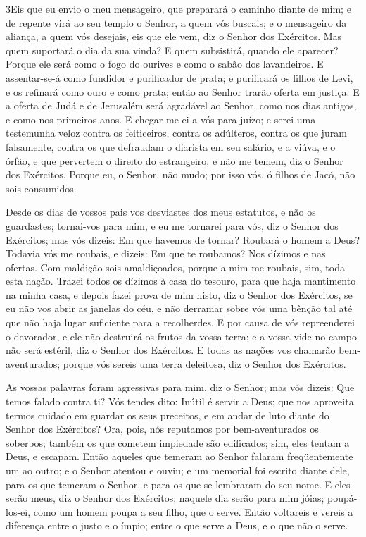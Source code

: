 \medskip

\lettrine{3} Eis que eu envio o meu mensageiro, que preparará
o caminho diante de mim; e de repente virá ao seu templo o Senhor, a
quem vós buscais; e o mensageiro da aliança, a quem vós desejais,
eis que ele vem, diz o Senhor dos Exércitos. Mas quem suportará
o dia da sua vinda? E quem subsistirá, quando ele aparecer? Porque
ele será como o fogo do ourives e como o sabão dos lavandeiros.
E assentar-se-á como fundidor e purificador de prata; e
purificará os filhos de Levi, e os refinará como ouro e como prata;
então ao Senhor trarão oferta em justiça. E a oferta de Judá e
de Jerusalém será agradável ao Senhor, como nos dias antigos, e como
nos primeiros anos. E chegar-me-ei a vós para juízo; e serei uma
testemunha veloz contra os feiticeiros, contra os adúlteros, contra
os que juram falsamente, contra os que defraudam o diarista em seu
salário, e a viúva, e o órfão, e que pervertem o direito do
estrangeiro, e não me temem, diz o Senhor dos Exércitos. Porque
eu, o Senhor, não mudo; por isso vós, ó filhos de Jacó, não sois
consumidos.

Desde os dias de vossos pais vos desviastes dos meus estatutos, e
não os guardastes; tornai-vos para mim, e eu me tornarei para vós,
diz o Senhor dos Exércitos; mas vós dizeis: Em que havemos de
tornar? Roubará o homem a Deus? Todavia vós me roubais, e
dizeis: Em que te roubamos? Nos dízimos e nas ofertas. Com
maldição sois amaldiçoados, porque a mim me roubais, sim, toda esta
nação. Trazei todos os dízimos à casa do tesouro, para que
haja mantimento na minha casa, e depois fazei prova de mim nisto,
diz o Senhor dos Exércitos, se eu não vos abrir as janelas do céu, e
não derramar sobre vós uma bênção tal até que não haja lugar
suficiente para a recolherdes. E por causa de vós
repreenderei o devorador, e ele não destruirá os frutos da vossa
terra; e a vossa vide no campo não será estéril, diz o Senhor dos
Exércitos. E todas as nações vos chamarão bem-aventurados;
porque vós sereis uma terra deleitosa, diz o Senhor dos Exércitos.

As vossas palavras foram agressivas para mim, diz o Senhor; mas
vós dizeis: Que temos falado contra ti? Vós tendes dito:
Inútil é servir a Deus; que nos aproveita termos cuidado em guardar
os seus preceitos, e em andar de luto diante do Senhor dos
Exércitos? Ora, pois, nós reputamos por bem-aventurados os
soberbos; também os que cometem impiedade são edificados; sim, eles
tentam a Deus, e escapam. Então aqueles que temeram ao Senhor
falaram freqüentemente um ao outro; e o Senhor atentou e ouviu; e um
memorial foi escrito diante dele, para os que temeram o Senhor, e
para os que se lembraram do seu nome. E eles serão meus, diz
o Senhor dos Exércitos; naquele dia serão para mim jóias;
poupá-los-ei, como um homem poupa a seu filho, que o serve.
Então voltareis e vereis a diferença entre o justo e o ímpio;
entre o que serve a Deus, e o que não o serve.

